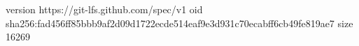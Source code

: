 version https://git-lfs.github.com/spec/v1
oid sha256:fad456ff85bbb9af2d09d1722ecde514eaf9e3d931c70ecabff6cb49fe819ae7
size 16269
